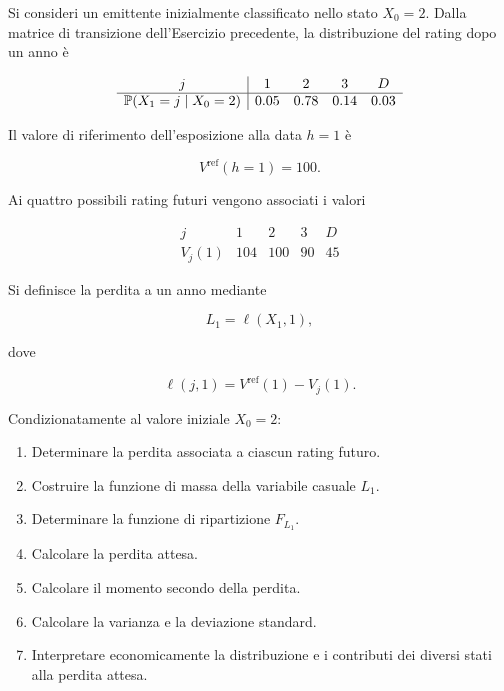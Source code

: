 \begin{exercise}

\label{ex:cap09-distribuzione-perdita}

Si consideri un emittente inizialmente classificato nello stato
$X_0=2$. Dalla matrice di transizione dell'Esercizio precedente, la
distribuzione del rating dopo un anno \`{e}

\[
\begin{array}{c|cccc}
j & 1 & 2 & 3 & D\\
\hline
\mathbb{P}(X_1=j\mid X_0=2)
&
0.05
&
0.78
&
0.14
&
0.03
\end{array}
\]

Il valore di riferimento dell'esposizione alla data $h=1$ \`{e}

\[
V^{\mathrm{ref}}(h=1)=100.
\]

Ai quattro possibili rating futuri vengono associati i valori

\[
\begin{array}{c|cccc}
j & 1 & 2 & 3 & D\\
\hline
V_j(1)
&
104
&
100
&
90
&
45
\end{array}
\]

Si definisce la perdita a un anno mediante

\[
L_1=\ell(X_1,1),
\]

dove

\[
\ell(j,1)
=
V^{\mathrm{ref}}(1)-V_j(1).
\]

Condizionatamente al valore iniziale $X_0=2$:

\begin{enumerate}

\item Determinare la perdita associata a ciascun rating futuro.

\item Costruire la funzione di massa della variabile casuale $L_1$.

\item Determinare la funzione di ripartizione $F_{L_1}$.

\item Calcolare la perdita attesa.

\item Calcolare il momento secondo della perdita.

\item Calcolare la varianza e la deviazione standard.

\item Interpretare economicamente la distribuzione e i contributi dei
diversi stati alla perdita attesa.

\end{enumerate}

\end{exercise}

